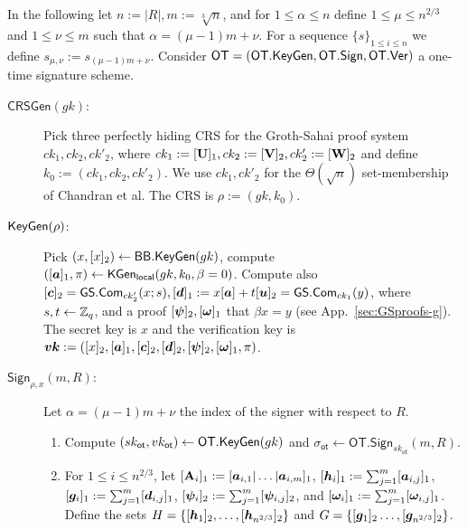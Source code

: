 
In the following let $n:=|R|, m:=\sqrt[3]{n}$, and for $1\leq \alpha\leq n$ define $1\leq \mu \leq n^{2/3}$ and $1\leq \nu\leq m$ such that $\alpha=(\mu-1)m+\nu$. For a sequence $\{s\}_{1\leq i\leq n}$ we define $s_{\mu,\nu}:=s_{(\mu-1)m+\nu}$. Consider $\mathsf{OT}=(\mathsf{OT}.\mathsf{KeyGen},\mathsf{OT}.\mathsf{Sign},\allowbreak\mathsf{OT}.\mathsf{Ver})$ a one-time signature scheme.

\begin{description}
\item[$\mathsf{CRSGen}(gk)$:] Pick three perfectly hiding CRS for the Groth-Sahai proof system $ck_1,ck_2,ck'_2$, where $ck_1 := [\mathbf{{U}}]_1,ck_2 :=[\mathbf{{V}}]_2,ck'_2:=[\mathbf{{W}}]_2$ and define $k_0 := (ck_1,ck_2,ck'_2)$. We use $ck_1,ck'_2$ for the $\Theta(\sqrt{n})$ set-membership of Chandran et al. The CRS is $\rho:=(gk,k_0).$

\item[$\mathsf{KeyGen}(\rho)$:] Pick $(x,[x]_2)\gets\mathsf{BB}.\mathsf{KeyGen}(gk)$, compute $([{\boldsymbol{a}}]_1,\pi)\allowbreak\gets\mathsf{KGen}_{\mathsf{local}}(gk,k_0,\beta = 0)$. Compute also $[{\boldsymbol{c}}]_2 = {\mathsf{GS}}.\mathsf{Com}_{ck'_2}(x;s),[{\boldsymbol{d}}]_1 :=x[{\boldsymbol{a}}]+t[{\boldsymbol{u}}]_2 = {\mathsf{GS}}.\mathsf{Com}_{ck_1}(y)$, where $s,t\gets\mathbb{Z}_q$, and a proof $[{\boldsymbol{\psi}}]_2,[{\boldsymbol{\omega}}]_1$ that $\beta x = y$ (see App.~\ref{sec:GSproofs-g}). The secret key is $x$ and the verification key is ${\boldsymbol{vk}}:=([x]_2,[{\boldsymbol{a}}]_1,[{\boldsymbol{c}}]_2,[{\boldsymbol{d}}]_2,[{\boldsymbol{\psi}}]_2,[{\boldsymbol{\omega}}]_1,\pi)$.

\item[$\mathsf{Sign}_{\rho,x}(m,R)$:] Let $\alpha=(\mu-1)m+\nu$ the index of the signer with respect to $R$.
\begin{enumerate}
\item Compute $(sk_\mathsf{ot},vk_\mathsf{ot})\gets\mathsf{OT}.\mathsf{KeyGen}(gk)$ and $\sigma_\mathsf{ot}\gets\allowbreak\mathsf{OT}.\allowbreak\mathsf{Sign}_{sk_\mathsf{ot}}(m,R)$.

\item For $1\leq i \leq n^{2/3}$, let $[\mathbf{{A}}_i]_1:=[{\boldsymbol{a}}_{i,1}|\allowbreak\ldots|\allowbreak{\boldsymbol{a}}_{i,m}]_1$, $[{\boldsymbol{h}}_i]_1 := \sum_{j=1}^m[{\boldsymbol{a}}_{i,j}]_1$, $[{\boldsymbol{g}}_i]_1:=\sum_{j=1}^{m}[{\boldsymbol{d}}_{i,j}]_1$, $[{\boldsymbol{\psi}}_i]_2 :=\sum_{j=1}^m [{\boldsymbol{\psi}}_{i,j}]_2$, and $[{\boldsymbol{\omega}}_i]_1:=\sum_{j=1}^m[{\boldsymbol{\omega}}_{i,j}]_1$. Define the sets
$H=\{[{\boldsymbol{h}}_1]_2,\ldots,[{\boldsymbol{h}}_{n^{2/3}}]_2\}$ and
$G=\{
	[{\boldsymbol{g}}_1]_2
	\allowbreak\ldots,\allowbreak
	[{\boldsymbol{g}}_{n^{2/3}}]_2\}$.


\end{enumerate}
\end{description}
